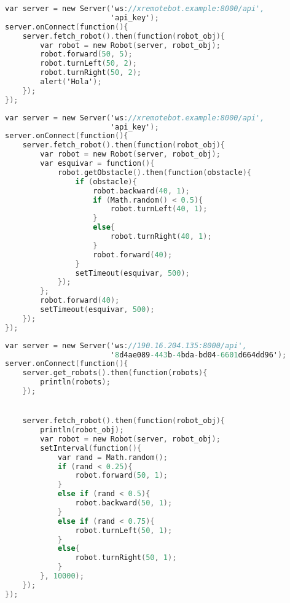 \begin{lstlisting}[language=C,
caption={Secuencia de movimientos},
label=lst:movimientos_js]
var server = new Server('ws://xremotebot.example:8000/api',
                        'api_key');
server.onConnect(function(){
    server.fetch_robot().then(function(robot_obj){
        var robot = new Robot(server, robot_obj);
        robot.forward(50, 5);
        robot.turnLeft(50, 2);
        robot.turnRight(50, 2);
        alert('Hola');
    });
});
\end{lstlisting}

\begin{lstlisting}[language=C,
caption={Ante un obstáculo el robot lo esquiva girando en un dirección aleatoria},
label=lst:esquivar_js]
var server = new Server('ws://xremotebot.example:8000/api',
                        'api_key');
server.onConnect(function(){
    server.fetch_robot().then(function(robot_obj){
        var robot = new Robot(server, robot_obj);
        var esquivar = function(){
            robot.getObstacle().then(function(obstacle){
                if (obstacle){
                    robot.backward(40, 1);
                    if (Math.random() < 0.5){
                        robot.turnLeft(40, 1);
                    }
                    else{
                        robot.turnRight(40, 1);
                    }
                    robot.forward(40);
                }
                setTimeout(esquivar, 500);
            });
        };
        robot.forward(40);
        setTimeout(esquivar, 500);
    });
});
\end{lstlisting}

\begin{lstlisting}[language=C,
caption={El robot se mueve en direcciones aleatorias},
label=lst:random_js]
var server = new Server('ws://190.16.204.135:8000/api',
                        '8d4ae089-443b-4bda-bd04-6601d664dd96');
server.onConnect(function(){
    server.get_robots().then(function(robots){
        println(robots);
    });


    server.fetch_robot().then(function(robot_obj){
        println(robot_obj);
        var robot = new Robot(server, robot_obj);
        setInterval(function(){
            var rand = Math.random();
            if (rand < 0.25){
                robot.forward(50, 1);
            }
            else if (rand < 0.5){
                robot.backward(50, 1);
            }
            else if (rand < 0.75){
                robot.turnLeft(50, 1);
            }
            else{
                robot.turnRight(50, 1);
            }
        }, 10000);
    });
});
\end{lstlisting}


